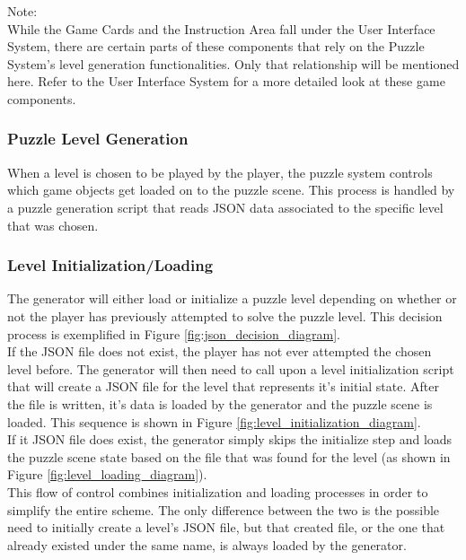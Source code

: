 Note:\\

While the Game Cards and the Instruction Area fall under the User
Interface System, there are certain parts of these components that rely on
the Puzzle System’s level generation functionalities. Only that relationship
will be mentioned here. Refer to the User Interface System for a more detailed
look at these game components.

\subsubsection{Puzzle Level Generation}
When a level is chosen to be played by the player, the puzzle system controls
which game objects get loaded on to the puzzle scene. This process is handled
by a puzzle generation script that reads JSON data associated to the specific
level that was chosen.

\subsubsection{Level Initialization/Loading}
The generator will either load or initialize a puzzle level depending on whether
or not the player has previously attempted to solve the puzzle level. This
decision process is exemplified in Figure \ref{fig:json_decision_diagram}.\\

If the JSON file does not exist, the player has not ever attempted the chosen level before. The
generator will then need to call upon a level initialization script that will
create a JSON file for the level that represents it's initial state. After the file
is written, it's data is loaded by the generator and the puzzle scene is loaded.
This sequence is shown in Figure \ref{fig:level_initialization_diagram}.\\

If it JSON file does exist, the generator simply skips the initialize step and
loads the puzzle scene state based on the file that was found for the level (as
shown in Figure \ref{fig:level_loading_diagram}).\\

This flow of control combines initialization and loading processes in order to simplify
the entire scheme. The only difference between the two is the possible need to
initially create a level's JSON file, but that created file, or the one that already
existed under the same name, is always loaded by the generator.\\

